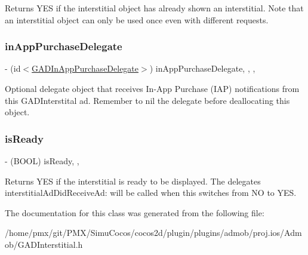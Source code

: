 Returns Y\+ES if the interstitial object has already shown an interstitial. Note that an interstitial object can only be used once even with different requests. \mbox{\label{interfaceGADInterstitial_ae0e33ef86c5ce259e026b8d523180543}} 
\subsubsection{\texorpdfstring{in\+App\+Purchase\+Delegate}{inAppPurchaseDelegate}}
{\footnotesize\ttfamily -\/ (id$<$\hyperlink{protocolGADInAppPurchaseDelegate-p}{G\+A\+D\+In\+App\+Purchase\+Delegate}$>$) in\+App\+Purchase\+Delegate\hspace{0.3cm}{\ttfamily [read]}, {\ttfamily [write]}, {\ttfamily [nonatomic]}, {\ttfamily [weak]}}

Optional delegate object that receives In-\/\+App Purchase (I\+AP) notifications from this G\+A\+D\+Interstital ad. Remember to nil the delegate before deallocating this object. \mbox{\label{interfaceGADInterstitial_a12198fa14bc46f0a52b903ba7b0a2de0}} 
\subsubsection{\texorpdfstring{is\+Ready}{isReady}}
{\footnotesize\ttfamily -\/ (B\+O\+OL) is\+Ready\hspace{0.3cm}{\ttfamily [read]}, {\ttfamily [nonatomic]}, {\ttfamily [assign]}}

Returns Y\+ES if the interstitial is ready to be displayed. The delegate\textquotesingle{}s interstitial\+Ad\+Did\+Receive\+Ad\+: will be called when this switches from NO to Y\+ES. 

The documentation for this class was generated from the following file\+:\begin{DoxyCompactItemize}
\item 
/home/pmx/git/\+P\+M\+X/\+Simu\+Cocos/cocos2d/plugin/plugins/admob/proj.\+ios/\+Admob/G\+A\+D\+Interstitial.\+h\end{DoxyCompactItemize}
